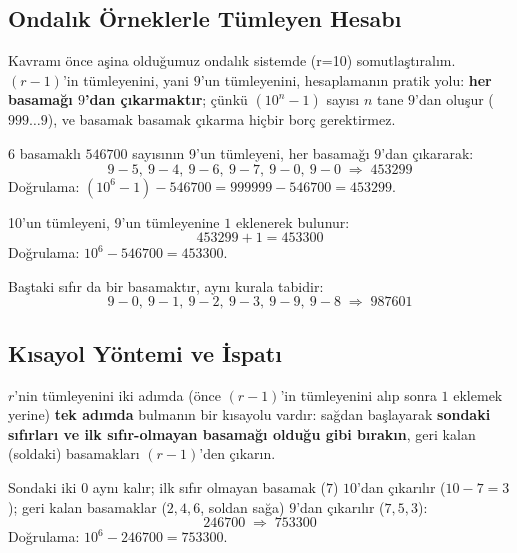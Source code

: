\subsection{Ondalık Örneklerle Tümleyen Hesabı}
\label{sec:tumleyen-ondalik}

Kavramı önce aşina olduğumuz ondalık sistemde (r=10) somutlaştıralım. $(r{-}1)$'in
tümleyenini, yani $9$'un tümleyenini, hesaplamanın pratik yolu: \textbf{her basamağı $9$'dan
çıkarmaktır}; çünkü $(10^n-1)$ sayısı $n$ tane $9$'dan oluşur ($999\ldots9$), ve
basamak basamak çıkarma hiçbir borç gerektirmez.

\begin{ornek}[$546700$'ün 9'un ve 10'un Tümleyeni]
$6$ basamaklı $546700$ sayısının 9'un tümleyeni, her basamağı $9$'dan çıkararak:
\[
9{-}5,\ 9{-}4,\ 9{-}6,\ 9{-}7,\ 9{-}0,\ 9{-}0 \;\Rightarrow\; 453299
\]
Doğrulama: $(10^6-1)-546700 = 999999-546700=453299$. \checkmark

10'un tümleyeni, 9'un tümleyenine $1$ eklenerek bulunur:
\[
453299+1=453300
\]
Doğrulama: $10^6-546700=453300$. \checkmark
\end{ornek}

\begin{ornek}[$012398$'in 9'un Tümleyeni]
Baştaki sıfır da bir basamaktır, aynı kurala tabidir:
\[
9{-}0,\ 9{-}1,\ 9{-}2,\ 9{-}3,\ 9{-}9,\ 9{-}8 \;\Rightarrow\; 987601
\]
\end{ornek}

\subsection{Kısayol Yöntemi ve İspatı}
\label{sec:tumleyen-kisayol}

\begin{bilginot}
$r$'nin tümleyenini iki adımda (önce $(r{-}1)$'in tümleyenini alıp sonra $1$ eklemek yerine)
\textbf{tek adımda} bulmanın bir kısayolu vardır: sağdan başlayarak \textbf{sondaki sıfırları
ve ilk sıfır-olmayan basamağı olduğu gibi bırakın}, geri kalan (soldaki) basamakları
$(r{-}1)$'den çıkarın.
\end{bilginot}

\begin{ornek}
Sondaki iki $0$ aynı kalır; ilk sıfır olmayan basamak ($7$) $10$'dan çıkarılır
($10{-}7=3$); geri kalan basamaklar ($2,4,6$, soldan sağa) $9$'dan çıkarılır ($7,5,3$):
\[
246700 \;\Rightarrow\; 753300
\]
Doğrulama: $10^6-246700=753300$. \checkmark
\end{ornek}

